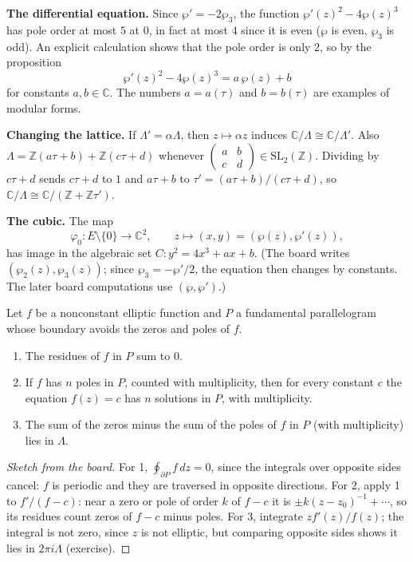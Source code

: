 \medskip\noindent
{\bf The differential equation.} Since
$\wp' = -2\wp_3$, the function
$\wp'(z)^2 - 4\wp(z)^3$ has pole order at
most $5$ at $0$, in fact at most $4$ since
it is even ($\wp$ is even, $\wp_3$ is odd).
An explicit calculation shows that the pole
order is only $2$, so by the proposition
$$
\wp'(z)^2 - 4\wp(z)^3 = a\,\wp(z) + b
$$
for constants $a, b \in \mathbb{C}$. The
numbers $a = a(\tau)$ and $b = b(\tau)$ are
examples of modular forms.

\medskip\noindent
{\bf Changing the lattice.} If $\Lambda' =
\alpha\Lambda$, then $z \mapsto \alpha z$
induces $\mathbb{C}/\Lambda \cong
\mathbb{C}/\Lambda'$. Also $\Lambda =
\mathbb{Z}(a\tau+b) + \mathbb{Z}(c\tau+d)$
whenever $\left(\begin{smallmatrix} a & b
\\ c & d \end{smallmatrix}\right) \in
\mathrm{SL}_2(\mathbb{Z})$. Dividing by
$c\tau+d$ sends $c\tau + d$ to $1$ and
$a\tau+b$ to $\tau' = (a\tau+b)/(c\tau+d)$,
so $\mathbb{C}/\Lambda \cong
\mathbb{C}/(\mathbb{Z} + \mathbb{Z}\tau')$.

\medskip\noindent
{\bf The cubic.} The map
$$
\varphi_0 : E \setminus \{0\} \to
\mathbb{C}^2,
\qquad
z \mapsto (x,y) = (\wp(z), \wp'(z)),
$$
has image in the algebraic set
$C : y^2 = 4x^3 + ax + b$. (The board writes
$(\wp_2(z),\wp_3(z))$; since $\wp_3 =
-\wp'/2$, the equation then changes by
constants. The later board computations use
$(\wp,\wp')$.)

\begin{theorem}
\label{theorem-elliptic-residues}
Let $f$ be a nonconstant elliptic function
and $P$ a fundamental parallelogram whose
boundary avoids the zeros and poles of $f$.
\begin{enumerate}
\item The residues of $f$ in $P$ sum to $0$.
\item If $f$ has $n$ poles in $P$, counted
with multiplicity, then for every constant
$c$ the equation $f(z) = c$ has $n$
solutions in $P$, with multiplicity.
\item The sum of the zeros minus the sum of
the poles of $f$ in $P$ (with multiplicity)
lies in $\Lambda$.
\end{enumerate}
\end{theorem}

\begin{proof}[Sketch from the board]
For 1, $\oint_{\partial P} f\,dz = 0$, since
the integrals over opposite sides cancel:
$f$ is periodic and they are traversed in
opposite directions. For 2, apply 1 to
$f'/(f-c)$: near a zero or pole of order
$k$ of $f - c$ it is $\pm k(z-z_0)^{-1} +
\cdots$, so its residues count zeros of
$f - c$ minus poles. For 3, integrate
$z f'(z)/f(z)$; the integral is not zero,
since $z$ is not elliptic, but comparing
opposite sides shows it lies in $2\pi i
\Lambda$ (exercise).
\end{proof}


